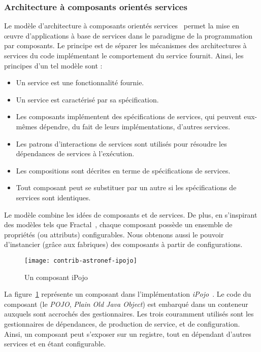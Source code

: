 \subsubsection{Architecture à composants orientés services}
Le modèle d'architecture à composants orientés services~\cite{Cervantes:servicecomponent} permet la mise en œuvre d'applications à base de services dans le paradigme de la programmation par composants. Le principe est de séparer les mécanismes des architectures à services du code implémentant le comportement du service fournit. Ainsi, les principes d'un tel modèle sont :
\begin{itemize}
    \item Un service est une fonctionnalité fournie.
    \item Un service est caractérisé par sa spécification.
    \item Les composants implémentent des spécifications de services, qui peuvent eux-mêmes dépendre, du fait de leurs implémentations, d'autres services.
    \item Les patrons d'interactions de services sont utilisés pour résoudre les dépendances de services à l'exécution.
    \item Les compositions sont décrites en terme de spécifications de services.
    \item Tout composant peut se substituer par un autre si les spécifications de services sont identiques.
\end{itemize}
Le modèle combine les idées de composants et de services. De plus, en s'inspirant des modèles tels que Fractal~\cite{Bruneton:fractal}, chaque composant possède un ensemble de propriétés (ou attributs) configurables. Nous obtenons aussi le pouvoir d'instancier (grâce aux fabriques) des composants à partir de configurations.

\begin{figure}[ht]
    \centering
    \texttt{[image: contrib-astronef-ipojo]}
    \caption{Un composant iPojo}\label{fig:contrib:astronef:ipojo}
\end{figure}
La figure~\ref{fig:contrib:astronef:ipojo} représente un composant dans l'implémentation \textit{iPojo}~\cite{Escoffier:ipojo}. Le code du composant (le \textit{POJO}, \textit{Plain Old Java Object}) est embarqué dans un conteneur auxquels sont accrochés des gestionnaires. Les trois couramment utilisés sont les gestionnaires de dépendances, de production de service, et de configuration. Ainsi, un composant peut s'exposer sur un registre, tout en dépendant d'autres services et en étant configurable.

